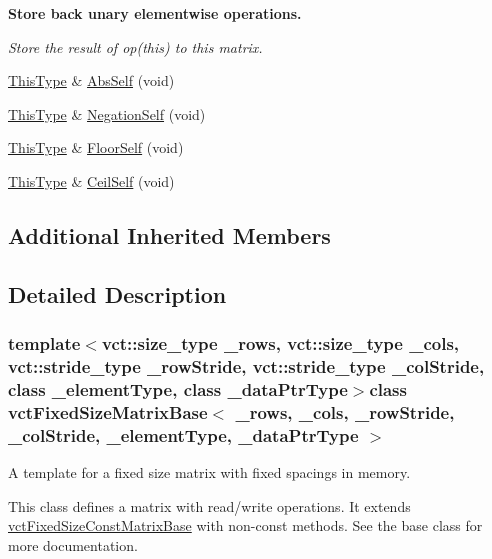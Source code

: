 \begin{Indent}{\bf Store back unary elementwise operations.}\par
{\em Store the result of op(this) to this matrix. }\begin{DoxyCompactItemize}
\item 
\hyperlink{classvct_fixed_size_const_matrix_base_a7ec66a96ed7e08ce9ff54093133c9d8d}{This\+Type} \& \hyperlink{classvct_fixed_size_matrix_base_aa4e74a88ea309570cb7913679b1a9a87}{Abs\+Self} (void)
\item 
\hyperlink{classvct_fixed_size_const_matrix_base_a7ec66a96ed7e08ce9ff54093133c9d8d}{This\+Type} \& \hyperlink{classvct_fixed_size_matrix_base_a5be3db076761851d7882f10365ea4d02}{Negation\+Self} (void)
\item 
\hyperlink{classvct_fixed_size_const_matrix_base_a7ec66a96ed7e08ce9ff54093133c9d8d}{This\+Type} \& \hyperlink{classvct_fixed_size_matrix_base_a633b352b4fa6c4d95c41523a1fe5dd14}{Floor\+Self} (void)
\item 
\hyperlink{classvct_fixed_size_const_matrix_base_a7ec66a96ed7e08ce9ff54093133c9d8d}{This\+Type} \& \hyperlink{classvct_fixed_size_matrix_base_a9233d13ce6ad593e3e1e1a3186b76be1}{Ceil\+Self} (void)
\end{DoxyCompactItemize}
\end{Indent}
\subsection*{Additional Inherited Members}


\subsection{Detailed Description}
\subsubsection*{template$<$vct\+::size\+\_\+type \+\_\+rows, vct\+::size\+\_\+type \+\_\+cols, vct\+::stride\+\_\+type \+\_\+row\+Stride, vct\+::stride\+\_\+type \+\_\+col\+Stride, class \+\_\+element\+Type, class \+\_\+data\+Ptr\+Type$>$class vct\+Fixed\+Size\+Matrix\+Base$<$ \+\_\+rows, \+\_\+cols, \+\_\+row\+Stride, \+\_\+col\+Stride, \+\_\+element\+Type, \+\_\+data\+Ptr\+Type $>$}

A template for a fixed size matrix with fixed spacings in memory. 

This class defines a matrix with read/write operations. It extends \hyperlink{classvct_fixed_size_const_matrix_base}{vct\+Fixed\+Size\+Const\+Matrix\+Base} with non-\/const methods. See the base class for more documentation.

